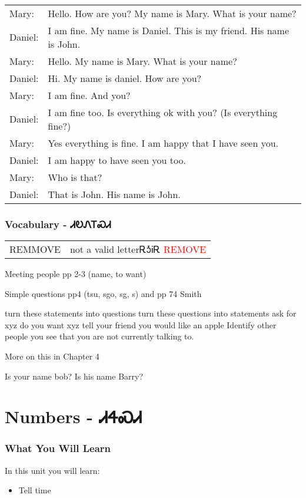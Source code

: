 \\
\\
\\
\noindent\begin{tabular}{p{2cm} p{11cm}}Mary: & Hello.  How are you?  My name is Mary.  What is your name?\\
Daniel: & I am fine.  My name is Daniel.  This is my friend.  His name is John.\\
Mary: & Hello.  My name is Mary.  What is your name?\\
Daniel: & Hi.  My name is daniel.  How are you?\\
Mary: & I am fine.  And you?\\
Daniel: & I am fine too.  Is everything ok with you? (Is everything fine?)\\
Mary: & Yes everything is fine.  I am happy that I have seen you.\\
Daniel: & I am happy to have seen you too.\\
Mary: & Who is that?\\
Daniel: & That is John.  His name is John.\\
\end{tabular}
\subsection{Vocabulary - ᏗᎧᏁᎢᏍᏗ 
}
\begin{tabular}{p{3cm} p{11cm}}
REMMOVE & not a valid letterᎡᎼᎥᎡ 
 \newline \textcolor{red}{REMOVE}\\
\end{tabular}


    Meeting people pp 2-3 (name, to want)

    Simple questions pp4 (tsu, sgo, sg, s) and pp 74 Smith

    turn these statements into questions
    turn these questions into statements
    ask for xyz
    do you want xyz
    tell your friend you would like an apple
    Identify other people you see that you are not currently talking to.

    More on this in Chapter 4

    Is your name bob?
    Is his name Barry?
\chapter{Numbers - ᏗᏎᏍᏗ}
\subsection{What You Will Learn}
In this unit you will learn:
\begin{itemize}
\item Tell time
\end{itemize}\newpage

